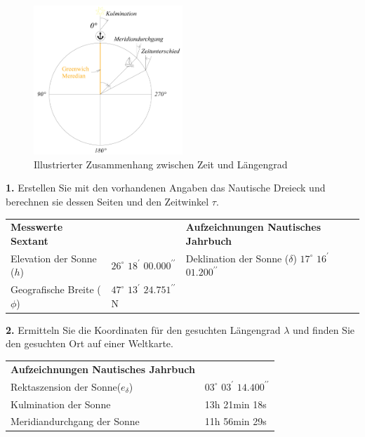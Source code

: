 \begin{refsection}
\begin{figure}
\centering
\includegraphics[width=0.5\textwidth]{kugel/Uhr.jpg}
\caption{Illustrierter Zusammenhang zwischen Zeit und Längengrad}
\label{Uhr}
\end{figure}

\textbf{1.} Erstellen Sie mit den vorhandenen Angaben das Nautische Dreieck und berechnen sie dessen Seiten und den Zeitwinkel $\tau$.

\begin{center}
\renewcommand{\arraystretch}{1.5}
\begin{tabular}{llll}
\textbf{Messwerte Sextant} & &\textbf{Aufzeichnungen Nautisches Jahrbuch} \\
Elevation der Sonne ($h$) &$26^{\circ}$ $18^{\prime}$ $00.000^{\prime \prime}$ & Deklination der Sonne ($\delta$)  \quad$17^{\circ}$ $16^{\prime}$ $01.200^{\prime \prime}$ \\
Geografische Breite ($\phi$) &$47^{\circ}$ $13^{\prime}$ $24.751^{\prime \prime}$ N
\end{tabular}
\end{center}


\textbf{2.} Ermitteln Sie die Koordinaten für den gesuchten Längengrad
$\lambda$ und finden Sie den gesuchten Ort auf einer Weltkarte.

\begin{center}
\renewcommand{\arraystretch}{1.5}
\begin{tabular}{ll}
\textbf{Aufzeichnungen Nautisches Jahrbuch} \\
Rektaszension der Sonne\footnotemark ($e_\delta$) &$03^{\circ}$ $03^{\prime}$ $14.400^{\prime \prime}$ \\
Kulmination der Sonne &13h 21min 18s \\
Meridiandurchgang der Sonne &11h 56min 29s
\end{tabular}
\end{center}


\end{refsection}
